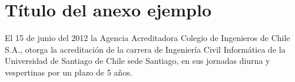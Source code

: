 \chapter{Título del anexo ejemplo}
\label{finales:anexo1}
El 15 de junio del 2012 la Agencia Acreditadora Colegio de Ingenieros de Chile S.A., otorga la acreditación de la carrera de Ingeniería Civil Informática de la Universidad de Santiago de Chile sede Santiago, en sus jornadas diurna y vespertinas por un plazo de 5 años.